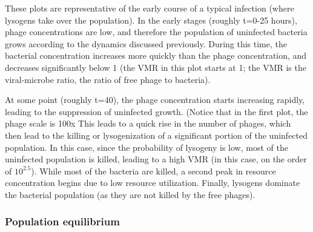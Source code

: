 \documentclass{article}
\begin{document}
These plots are representative of the early course of a typical infection (where lysogens take over the population). In the early stages (roughly t=0-25 hours), phage concentrations are low, and therefore the population of uninfected bacteria grows according to the dynamics discussed previously. During this time, the bacterial concentration increases more quickly than the phage concentration, and decreases significantly below 1 (the VMR in this plot starts at 1; the VMR is the viral-microbe ratio, the ratio of free phage to bacteria). 

At some point (roughly t=40), the phage concentration starts increasing rapidly, leading to the suppression of uninfected growth. (Notice that in the first plot, the phage scale is 100x This leads to a quick rise in the number of phages, which then lead to the killing or lysogenization of a significant portion of the uninfected population. In this case, since the probability of lysogeny is low, most of the uninfected population is killed, leading to a high VMR (in this case, on the order of $10^{2.5}$). While most of the bacteria are killed, a second peak in resource concentration begins due to low resource utilization. Finally, lysogens dominate the bacterial population (as they are not killed by the free phages). 

\subsubsection{Population equilibrium}
\end{document}
